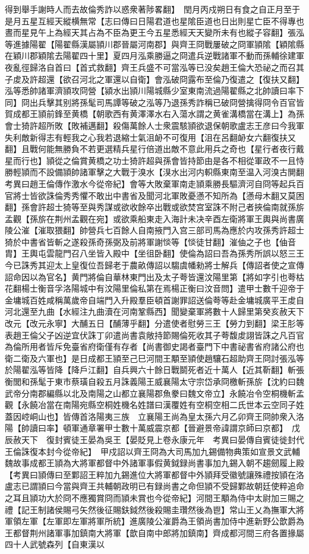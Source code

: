 得到舉手謝時人而去故倫秀詐以惑衆著陟畧翻】　閏月丙戍朔日有食之自正月至于是月五星互經天縱横無常【志曰傳曰日陽君道也星隂臣道也日出則星亡臣不得專也晝而星見午上為經天其占為不臣為更王今五星悉經天天變所未有也縱子容翻】張泓等進據陽翟【陽翟縣漢屬頴川郡晉屬河南郡】與齊王冏戰屢破之冏軍頴隂【穎隂縣在穎川郡穎隂去陽翟四十里】夏四月泓乘勝逼之冏遣兵逆戰諸軍不動而孫輔徐建軍夜亂徑歸洛自首曰【首式救翻】齊王兵盛不可當泓等已没矣趙王倫大恐祕之而召其子䖍及許超還【欲召河北之軍還以自衛】會泓破冏露布至倫乃復遣之【復扶又翻】泓等悉帥諸軍濟頴攻冏營【潁水出頴川陽城縣少室東南流過陽翟縣之北帥讀曰率下同】冏出兵擊其别將孫髦司馬譚等破之泓等乃退孫秀詐稱已破冏營擒得冏令百官皆賀成都王頴前鋒至黄橋【朝歌西有黄澤澤水右入蕩水謂之黄雀溝橋當在溝上】為孫會士猗許超所敗【敗補邁翻】殺傷萬餘人士衆震駭頴欲退保朝歌盧志王彦曰今我軍失利敵新得志有輕我之心我若退縮士氣沮䘐不可復用【沮在呂翻䘐女六翻復扶又翻】且戰何能無勝負不若更選精兵星行倍道出敵不意此用兵之奇也【星行者夜行戴星而行也】頴從之倫賞黄橋之功士猗許超與孫會皆持節由是各不相從軍政不一且恃勝輕頴而不設備頴帥諸軍擊之大戰于溴水【湨水出河内軹縣東南至温入河溴古閴翻　考異曰趙王倫傳作激水今從帝紀】會等大敗棄軍南走頴乘勝長驅濟河自冏等起兵百官將士皆欲誅倫秀秀懼不敢出中書省及聞河北軍敗憂懣不知所為【懣母木翻又莫困翻】孫會許超士猗等至與秀謀或欲收餘卒出戰或欲焚宫室誅不附己者挾倫南就孫旂孟觀【孫旂在荆州孟觀在宛】或欲乘船東走入海計未决辛酉左衛將軍王輿與尚書廣陵公漼【漼取猥翻】帥營兵七百餘人自南掖門入宫三部司馬為應於内攻孫秀許超士猗於中書省皆斬之遂殺孫奇孫弼及前將軍謝惔等【惔徒甘翻】漼伷之子也【伷音胄】王輿屯雲龍門召八坐皆入殿中【坐徂卧翻】使倫為詔曰吾為孫秀所誤以怒三王今已誅秀其迎太上皇復位吾歸老于農畝傳詔以騶虞幡勑將士解兵【傳詔者使之宣傳詔命因以為官名】黄門將倫自華林東門出及太子荂皆還汶陽里第【將如字引也荂枯花翻楊士衡音孚洛陽城中有汶陽里倫私第在焉楊正衡曰汶音問】遣甲士數千迎帝于金墉城百姓咸稱萬歲帝自端門入升殿羣臣頓首謝罪詔送倫荂等赴金墉城廣平王䖍自河北還至九曲【水經注九曲瀆在河南鞏縣西】聞變棄軍將數十人歸里第癸亥赦天下改元【改元永寧】大酺五日【酺薄乎翻】分遣使者慰勞三王【勞力到翻】梁王肜等表趙王倫父子凶逆宜伏誅丁卯遣尚書袁敞持節賜倫死收其子荂馥䖍詡皆誅之凡百官為倫所用者皆斥免臺省府衛僅有存者【尚書御史謁者臺門下中書祕書省府諸公府也衛二衛及六軍也】是日成都王頴至己巳河間王顒至頴使趙驤石超助齊王冏討張泓等於陽翟泓等皆降【降戶江翻】自兵興六十餘日戰鬬死者近十萬人【近其靳翻】斬張衡閭和孫髦于東市蔡璜自殺五月誅義陽王威襄陽太守宗岱承冏檄斬孫旂【沈約曰魏武帝分南郡編縣以北及南陽之山都立襄陽郡魚豢曰魏文帝立】永饒冶令空桐機斬孟觀【永饒冶當在南陽宛縣空桐姓機名姓譜曰漢覆姓有空桐空相二氏世本云空同子姓蓋因崆峒山也】皆傳首洛陽夷三族　立襄陽王尚為皇太孫六月乙卯齊王冏帥衆入洛陽【帥讀曰率】頓軍通章署甲士數十萬威震京都【晉避景帝諱謂京師曰京都】　戊辰赦天下　復封賓徒王晏為吳王【晏貶見上卷永康元年　考異曰晏傳自賓徒徙封代王倫誅復本封今從帝紀】　甲戍詔以齊王冏為大司馬加九錫備物典策如宣景文武輔魏故事成都王頴為大將軍都督中外諸軍事假黄鉞録尚書事加九錫入朝不趨劒履上殿　【考異曰頴傳曰至鄴詔王粹加九錫進位大將軍都督中外頴拜受徽號讓殊禮按頴在洛盧志已謂頴曰今當與齊王共輔朝政明已有録尚書之命但頴不受歸鄴故朝廷使粹追命之耳且頴功大於冏不應獨賞冏而頴未賞也今從帝紀】河間王顒為侍中太尉加三賜之禮【記王制諸侯賜弓矢然後征賜鈇鉞然後殺賜圭瓚然後為鬯】常山王乂為撫軍大將軍領左軍【左軍即左軍將軍所統】進廣陵公漼爵為王領尚書加侍中進新野公歆爵為王都督荆州諸軍事加鎮南大將軍【歆自南中郎將加鎮南】齊成都河間三府各置掾屬四十人武號森列【自東漢以